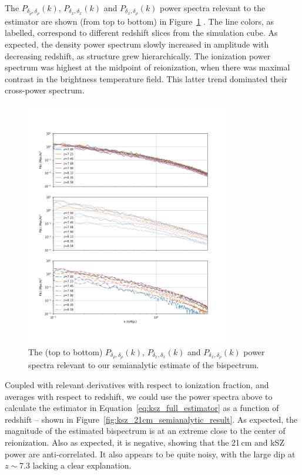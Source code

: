 The $P_{\delta_{\rho},\delta_{\rho}}(k)$, $P_{\delta_x,\delta_x}(k)$ and $P_{\delta_x,\delta_{\rho}}(k)$ power spectra relevant to the estimator are shown (from top to bottom) in Figure~\ref{fig:ksz_21cm_power_spectra_stuff} . The line colors, as labelled, correspond to different redshift slices from the simulation cube. As expected, the density power spectrum slowly increased in amplitude with decreasing redshift, as structure grew hierarchically.  The ionization power spectrum was highest at the midpoint of reionization, when there was maximal contrast in the brightness temperature field. This latter trend dominated their cross-power spectrum.

\begin{figure}
\centering
\includegraphics[width=0.8\textwidth]{chapters/ksz_21cm/figures/d_x_cross_powerspecs.png}
\caption[The $P_{\delta_{\rho},\delta_{\rho}}(k)$, $P_{\delta_x,\delta_x}(k)$ and $P_{\delta_x,\delta_{\rho}}(k)$ power spectra relevant to our semianalytic estimate of the bispectrum.]{The (top to bottom) $P_{\delta_{\rho},\delta_{\rho}}(k)$, $P_{\delta_x,\delta_x}(k)$ and $P_{\delta_x,\delta_{\rho}}(k)$ power spectra relevant to our semianalytic estimate of the bispectrum.}
\label{fig:ksz_21cm_power_spectra_stuff}
\end{figure}

Coupled with relevant derivatives with respect to ionization fraction, and averages with respect to redshift, we could use the power spectra above to calculate the estimator in Equation~\ref{eq:ksz_full_estimator} as a function of redshift -- shown in Figure~\ref{fig:ksz_21cm_semianalytic_result}. As expected, the magnitude of the estimated bispectrum is at an extreme close to the center of reionization. Also as expected, it is negative, showing that the 21\,cm and kSZ power are anti-correlated. It also appears to be quite noisy, with the large dip at $z\sim 7.3$ lacking a clear explanation.

